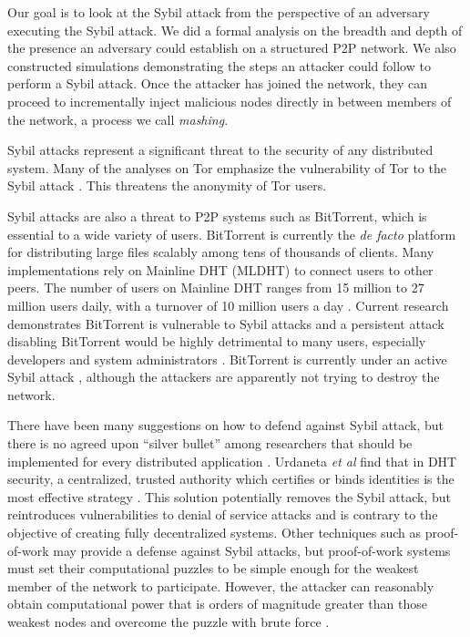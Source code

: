 Our goal is to look at the Sybil attack from the perspective of an adversary executing the Sybil attack.
We did a formal analysis on the breadth and depth of the presence an adversary could establish on a structured P2P network.
We also constructed simulations demonstrating the steps an attacker could follow to perform a Sybil attack.
Once the attacker has joined the network, they can proceed to incrementally inject malicious nodes directly in between members of the network, a process we call \textit{mashing}.

Sybil attacks represent a significant threat to the security of any distributed system.
Many of the analyses on Tor \cite{dingledine2004tor} emphasize the vulnerability of Tor to the Sybil attack \cite{bauer2007low}.
This threatens the anonymity of Tor users.

Sybil attacks are also a threat to P2P systems such as BitTorrent, which is essential to a wide variety of users.
BitTorrent is currently the \textit{de facto} platform for distributing large files scalably among tens of thousands of clients.
Many implementations rely on Mainline DHT (MLDHT) \cite{mainline} to connect users to other peers.
The number of users on Mainline DHT ranges from 15 million to 27 million users daily, with a turnover of 10 million users a day \cite{mainlineMeasure}.
Current research demonstrates BitTorrent is vulnerable to Sybil attacks and a persistent attack disabling BitTorrent would be highly detrimental to many users, especially developers and system administrators \cite{izal2004dissecting}.
BitTorrent is currently under an active Sybil attack \cite{sybilbit}, although the attackers are apparently not trying to destroy the network.

There have been many suggestions on how to defend against Sybil attack, but there is no agreed upon ``silver bullet'' among researchers that should be implemented for every distributed application \cite{levine2006survey} \cite{dhtsec}.
Urdaneta \textit{et al} find that in DHT security, a centralized, trusted authority which certifies or binds identities is the most effective strategy \cite{dhtsec}.
This solution potentially removes the Sybil attack, but reintroduces vulnerabilities to denial of service attacks and is contrary to the objective of creating fully decentralized systems.
Other techniques such as proof-of-work \cite{4215910} may provide a defense against Sybil attacks, but proof-of-work systems must set their computational puzzles to be simple enough for the weakest member of the network to participate.
However, the attacker can reasonably obtain computational power that is orders of magnitude greater than those weakest nodes and overcome the puzzle with brute force \cite{dhtsec}.

